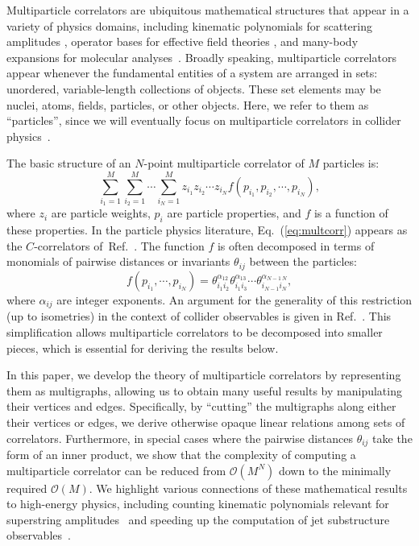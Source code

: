 \documentclass[aps,prd,floatfix,preprintnumbers,twocolumn,groupedaddress,nofootinbib,longbibliography,10pt]{revtex4-1}
\renewcommand{\O}{\mathcal{O}}
\DeclareRobustCommand{\Eq}[1]{Eq.~(\ref{#1})}
\DeclareRobustCommand{\Ref}[1]{Ref.~\cite{#1}}
\begin{document}
Multiparticle correlators are ubiquitous mathematical structures that appear in a variety of physics domains, including kinematic polynomials for scattering amplitudes \cite{Boels:2013jua,oeisA226919}, operator bases for effective field theories \cite{Hogervorst:2014rta,Henning:2017fpj}, and many-body expansions for molecular analyses~\cite{PhysRevB.46.2133,doi:10.1021/ct9004917}.
%
Broadly speaking, multiparticle correlators appear whenever the fundamental entities of a system are arranged in sets: unordered, variable-length collections of objects.
%
These set elements may be nuclei, atoms, fields, particles, or other objects.
%
Here, we refer to them as ``particles'', since we will eventually focus on multiparticle correlators in collider physics~\cite{Larkoski:2013eya,Larkoski:2014gra,Komiske:2017aww}.


The basic structure of an $N$-point multiparticle correlator of $M$ particles is:
%
\begin{equation}
\label{eq:multcorr}
\sum_{i_1=1}^M\sum_{i_2=1}^M\cdots\sum_{i_N=1}^M z_{i_1}z_{i_2}\cdots z_{i_N} f(p_{i_1}, p_{i_2},\cdots, p_{i_N}),
\end{equation}
%
where $z_i$ are particle weights, $p_i$ are particle properties, and $f$ is a function of these properties.
%
In the particle physics literature, \Eq{eq:multcorr} appears as the $C$-correlators of~\Ref{Tkachov:1995kk}.
%
The function $f$ is often decomposed in terms of monomials of pairwise distances or invariants $\theta_{ij}$ between the particles:
%
\begin{equation}
\label{eq:fdecomp}
f(p_{i_1},\cdots,p_{i_N}) =  \theta_{i_1i_2}^{\alpha_{12}} \theta_{i_1 i_3}^{\alpha_{13}}\cdots \theta_{i_{N-1}i_N}^{\alpha_{N-1\,N}},
\end{equation}
%
where $\alpha_{ij}$ are integer exponents.
%
An argument for the generality of this restriction (up to isometries) in the context of collider observables is given in \Ref{Komiske:2017aww}.
%
This simplification allows multiparticle correlators to be decomposed into smaller pieces, which is essential for deriving the results below.


In this paper, we develop the theory of multiparticle correlators by representing them as multigraphs, allowing us to obtain many useful results by manipulating their vertices and edges.
%
Specifically, by ``cutting'' the multigraphs along either their vertices or edges, we derive otherwise opaque linear relations among sets of correlators.
%
Furthermore, in special cases where the pairwise distances $\theta_{ij}$ take the form of an inner product, we show that the complexity of computing a multiparticle correlator can be reduced from $\O(M^N)$ down to the minimally required $\O(M)$.
%
We highlight various connections of these mathematical results to high-energy physics, including counting kinematic polynomials relevant for superstring amplitudes~\cite{Boels:2013jua,oeisA226919} and speeding up the computation of jet substructure observables~\cite{Larkoski:2013eya,Larkoski:2014gra,Komiske:2017aww}.
\end{document}
